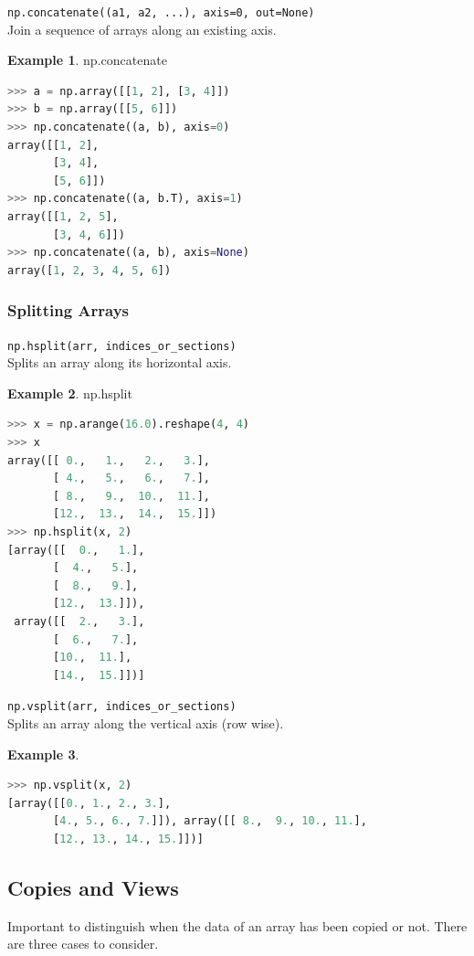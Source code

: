 \documentclass{article}
\theoremstyle{definition}
\newtheorem{ex}{Example}[subsection]
\theoremstyle{remark}
\newcommand{\func}[2]{\noindent\lstinline{#1}\\#2}
\begin{document}
\func{np.concatenate((a1, a2, ...), axis=0, out=None)}{Join a sequence of arrays along an existing axis.}

\begin{ex} np.concatenate
\begin{lstlisting}[language=Python]
>>> a = np.array([[1, 2], [3, 4]])
>>> b = np.array([[5, 6]])
>>> np.concatenate((a, b), axis=0)
array([[1, 2],
       [3, 4],
       [5, 6]])
>>> np.concatenate((a, b.T), axis=1)
array([[1, 2, 5],
       [3, 4, 6]])
>>> np.concatenate((a, b), axis=None)
array([1, 2, 3, 4, 5, 6])
\end{lstlisting}
\end{ex}

\subsubsection{Splitting Arrays}

\func{np.hsplit(arr, indices_or_sections)}{Splits an array along its horizontal axis.}

\begin{ex} np.hsplit
\begin{lstlisting}[language=Python]
>>> x = np.arange(16.0).reshape(4, 4)
>>> x
array([[ 0.,   1.,   2.,   3.],
       [ 4.,   5.,   6.,   7.],
       [ 8.,   9.,  10.,  11.],
       [12.,  13.,  14.,  15.]])
>>> np.hsplit(x, 2)
[array([[  0.,   1.],
       [  4.,   5.],
       [  8.,   9.],
       [12.,  13.]]),
 array([[  2.,   3.],
       [  6.,   7.],
       [10.,  11.],
       [14.,  15.]])]
\end{lstlisting}
\end{ex}


\func{np.vsplit(arr, indices_or_sections)}{Splits an array along the vertical axis (row wise).}

\begin{ex}\lstinline{}
\begin{lstlisting}[language=Python]
>>> np.vsplit(x, 2)
[array([[0., 1., 2., 3.],
       [4., 5., 6., 7.]]), array([[ 8.,  9., 10., 11.],
       [12., 13., 14., 15.]])]
\end{lstlisting}
\end{ex}


\break


\subsection{Copies and Views}

Important to distinguish when the data of an array has been copied or not. There are three cases to consider.
\end{document}
